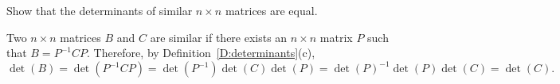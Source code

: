 \documentclass{ximera}
\begin{document}
\begin{exercise} \label{c10.1.3}
Show that the determinants of similar $n\times n$ matrices are
equal. 

\begin{solution}
\soln
Two $n \times n$ matrices $B$ and $C$ are similar if there exists
an $n \times n$ matrix $P$ such that $B = P^{-1}CP$.  Therefore, by
Definition~\ref{D:determinants}(c),
\[
\det(B) = \det(P^{-1}CP)
= \det(P^{-1})\det(C)\det(P)
= \det(P)^{-1}\det(P)\det(C)
= \det(C).
\]

\end{solution}
\end{exercise}
\end{document}
